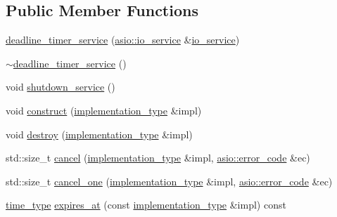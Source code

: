 \subsection*{Public Member Functions}
\begin{DoxyCompactItemize}
\item 
\hyperlink{classasio_1_1detail_1_1deadline__timer__service_a9d778b855ccb8db82f300ed107929322}{deadline\+\_\+timer\+\_\+service} (\hyperlink{classasio_1_1io__service}{asio\+::io\+\_\+service} \&\hyperlink{classasio_1_1io__service}{io\+\_\+service})
\item 
\hyperlink{classasio_1_1detail_1_1deadline__timer__service_a4b5571b64d826e239d8908e13053516f}{$\sim$deadline\+\_\+timer\+\_\+service} ()
\item 
void \hyperlink{classasio_1_1detail_1_1deadline__timer__service_a206122f643a903feb1ccd94ad5d41149}{shutdown\+\_\+service} ()
\item 
void \hyperlink{classasio_1_1detail_1_1deadline__timer__service_a0ce93932e78e84f6cb13e51afb755e9b}{construct} (\hyperlink{structasio_1_1detail_1_1deadline__timer__service_1_1implementation__type}{implementation\+\_\+type} \&impl)
\item 
void \hyperlink{classasio_1_1detail_1_1deadline__timer__service_a9dec32db50666ae9824a293fc17d8055}{destroy} (\hyperlink{structasio_1_1detail_1_1deadline__timer__service_1_1implementation__type}{implementation\+\_\+type} \&impl)
\item 
std\+::size\+\_\+t \hyperlink{classasio_1_1detail_1_1deadline__timer__service_adbdd18c03bca98d0021f9fbe2caf7566}{cancel} (\hyperlink{structasio_1_1detail_1_1deadline__timer__service_1_1implementation__type}{implementation\+\_\+type} \&impl, \hyperlink{classasio_1_1error__code}{asio\+::error\+\_\+code} \&ec)
\item 
std\+::size\+\_\+t \hyperlink{classasio_1_1detail_1_1deadline__timer__service_a9ec1a022de9bf22834fa75d1d6eee2a5}{cancel\+\_\+one} (\hyperlink{structasio_1_1detail_1_1deadline__timer__service_1_1implementation__type}{implementation\+\_\+type} \&impl, \hyperlink{classasio_1_1error__code}{asio\+::error\+\_\+code} \&ec)
\item 
\hyperlink{classasio_1_1detail_1_1deadline__timer__service_a217817497abe6136c056c0facdd3f8aa}{time\+\_\+type} \hyperlink{classasio_1_1detail_1_1deadline__timer__service_a8fa751ddf7cdd5b96f725a84c684798e}{expires\+\_\+at} (const \hyperlink{structasio_1_1detail_1_1deadline__timer__service_1_1implementation__type}{implementation\+\_\+type} \&impl) const 
\item 

\end{DoxyCompactItemize}
